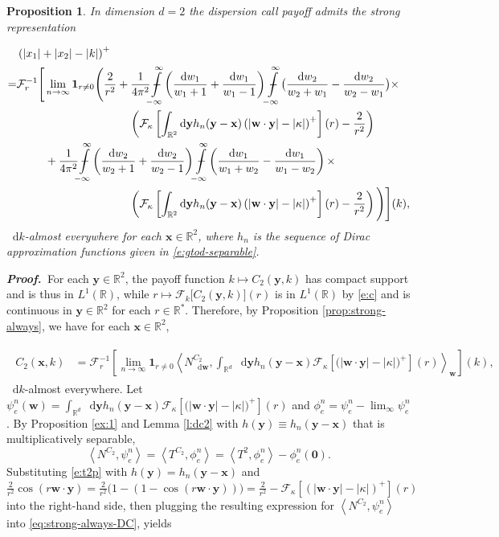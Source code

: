 \documentclass[11pt,A4,twoside]{article}
\numberwithin{equation}{section}
\renewcommand{\b}[1]{{\color{blue}#1}}
\newcommand{\intcl}{\!\!\Phint{\ \,-}\limits_{-\infty}^\infty\!}
\newcommand{\F}{\mathcal{F}}
\newcommand{\Fi}{\mathcal{F}^{-1}}
\renewcommand*\d{\mathop{}\!\mathrm{d}}
\newcommand{\inner}[1]{\left\langle#1 \right\rangle}
\newcommand{\x}{\mathbf{x}}
\newcommand{\y}{\mathbf{y}}
\newcommand{\w}{\mathbf{w}}
\newcommand{\R}{\mathbbm{R}}
\newcommand{\intRd}{\int_{\R^d}}
\def\Phint#1{\mathchoice
  {\XXint\displaystyle\textstyle{#1}}%
  {\XXint\textstyle\scriptstyle{#1}}%
  {\XXint\scriptstyle\scriptscriptstyle{#1}}%
  {\XXint\scriptscriptstyle\scriptscriptstyle{#1}}%
  \!\int}
\def\XXint#1#2#3{{\setbox0=\hbox{$#1{#2#3}{\int}$}
    \vcenter{\hbox{$#2#3$}}\kern-.5\wd0}}
\def\qqq{\;\;\;\;\;\;\;\;\;}
\newcommand{\beqa}{\begin{eqnarray}}
\newcommand{\eeqa}{\end{eqnarray}}
\def\bal{\begin{aligned}}
\def\eal{\end{aligned}}
\def\bll#1{
\beqa\label{#1}\bal
}\def\lel{\eal\eeqa}
\newcommand{\beql}[1]{\bll{#1}}
\newcommand{\eeql}{\lel}
\newtheorem{proposition}[theorem]{Proposition}
\theoremstyle{definition}
\theoremstyle{remark}
\def\R{\mathbb{R}}
\def\proof{\noindent \emph{\textbf{Proof.} $\, $}}
\def\theh{\b{h}}\def\theh{h}
\begin{document}
\begin{proposition}\label{p:dc2}
    In dimension $d=2$ the dispersion call payoff admits the strong representation   
    \beql{e:dc-strong}
     &\left(|x_1| + |x_2| - |k|\right)^+ \nonumber\\
     =& \Fi_r\Bigg[\lim_{n\to\infty}\mathbf{1}_{r\neq 0}\Bigg(\frac2{r^2}
         +\frac{1}{4\pi^2}\intcl \left(\frac{\d w_1}{ w_1+1}+\frac{\d w_1}{ w_1-1}\right)\intcl \big(\frac{\d w_2}{ w_2+w_1}-\frac{\d w_2}{ w_2-w_1}\big) \times
         \nonumber\\ & \qqq\qqq\qqq\qqq \left( \F_\kappa\left[ \int_{\R^2} \d\y h_n(\y-\x) \left( |\w\cdot\y| - |\kappa|\right)^+ \right](r) - \frac2{r^2} \right)
        \label{e:dc2}\\
        &\qqq+\frac1{4\pi^2} \intcl \left(\frac{\d w_2}{ w_2+1}+\frac{\d w_2}{ w_2-1}\right)\intcl \left(\frac{\d w_1}{ w_1+w_2}-\frac{\d w_1}{ w_1-w_2}\right) \times
        \nonumber\\ & \qqq\qqq\qqq\qqq \left(\F_\kappa\left[ \int_{\R^2} \d\y h_n(\y-\x) \left( |\w\cdot\y| - |\kappa|\right)^+ \right](r) - \frac2{r^2} \right) \Bigg)\Bigg](k),\nonumber
    \eeql
    $\d k$-almost everywhere for each $\x\in\R^2$,   where $h_n$ is the sequence of Dirac approximation functions given in \eqref{e:gtod-separable}.
\end{proposition}
\proof  For each $\y\in\R^2$, the payoff function $ k \mapsto C_2(\y,k)$ has compact support and is thus in $L^1(\R)$, while $ r \mapsto \F_k\big[ C_2(\y,k)\big](r)$ is in $L^1(\R)$ by \eqref{e:c} and is continuous in $\y\in\R^2 $ for each $r\in\R^*$.  Therefore, by Proposition \ref{prop:strong-always}, we have for each $\x\in\R^2$,
    \beql{eq:strong-always-DC}
        C_2(\x,k) & = \Fi_r\left[\lim_{n\to\infty} \mathbf{1}_{r\neq 0} \inner{N_{\d \w}^{C_2}, \intRd \d\y \theh_n(\y-\x) \F_\kappa\left[ \big(|\w \cdot \y | - |\kappa |\big)^+\right](r) }_{\w}\right](k), 
    \eeql   
$\d k$-almost everywhere. Let $\psi^n_e(\w) =\intRd \d\y \theh_n(\y-\x) \F_\kappa\left[ \big(|\w \cdot \y | - |\kappa |\big)^+\right](r) $ and
$\phi^n_e=\psi^n_e - \lim_{\boldsymbol\infty}\psi^n_e$.  By Proposition \ref{ex:1} and 
Lemma \ref{l:dc2} with $h(\y)\equiv h_n(\y-\x)$ that is multiplicatively separable,
\[
    \inner{N^{C_2}, \psi^n_e} = \inner{T^{C_2}, \phi^n_e}=\inner{T^2, \phi^n_e}- \phi^n_e(\boldsymbol{0}).
\]
Substituting \eqref{e:t2p} with $h(\y) = h_n(\y-\x)$ and $\frac2{r^2}\cos(r \w\cdot\y) = \frac2{r^2}\big(1-(1-\cos(r \w\cdot\y))\big) = \frac2{r^2}-\F_\kappa\left[ \left( |\w\cdot\y| - |\kappa|\right)^+ \right](r)$ into the right-hand side, then plugging the resulting expression for $\inner{N^{C_2}, \psi^n_e}$ into \eqref{eq:strong-always-DC}, yields
\end{document}
